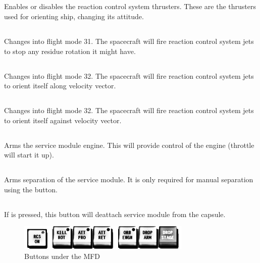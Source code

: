 \subsection{}
Enables or disables the reaction control system thrusters. These are the thrusters used for orienting ship, changing its attitude.

\subsection{}
Changes into flight mode 31. The spacecraft will fire reaction control system jets to stop any residue rotation it might have.

\subsection{}
Changes into flight mode 32. The spacecraft will fire reaction control system jets to orient itself along velocity vector.

\subsection{}
Changes into flight mode 32. The spacecraft will fire reaction control system jets to orient itself against velocity vector.

\subsection{}
Arms the service module engine. This will provide control of the engine (throttle will start it up).

\subsection{}
Arms separation of the service module. It is only required for manual separation using the  button.

\subsection{}
If  is pressed, this button will deattach service module from the capsule.

\begin{figure}[htb]
\centering
\includegraphics[bb=0 0 11cm 1.6cm,scale=0.75]{../graphics/rv550_buttons2.png}
\caption{Buttons under the MFD}
\end{figure}


